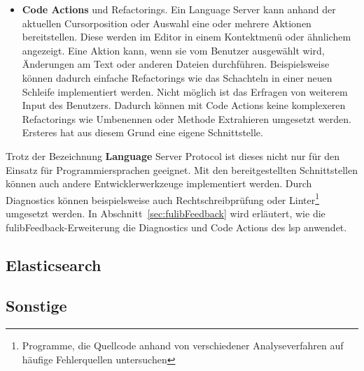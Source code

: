 \begin{itemize}
    \item \textbf{Code Actions} und Refactorings.
    Ein Language Server kann anhand der aktuellen Cursorposition oder Auswahl eine oder mehrere Aktionen bereitstellen.
    Diese werden im Editor in einem Kontektmenü oder ähnlichem angezeigt.
    Eine Aktion kann, wenn sie vom Benutzer ausgewählt wird, Änderungen am Text oder anderen Dateien durchführen.
    Beispielsweise können dadurch einfache Refactorings wie das Schachteln in einer neuen Schleife implementiert werden.
    Nicht möglich ist das Erfragen von weiterem Input des Benutzers.
    Dadurch können mit Code Actions keine komplexeren Refactorings wie Umbenennen oder Methode Extrahieren umgesetzt werden.
    Ersteres hat aus diesem Grund eine eigene Schnittstelle.
\end{itemize}

Trotz der Bezeichnung \textbf{Language} Server Protocol ist dieses nicht nur für den Einsatz für Programmiersprachen geeignet.
Mit den bereitgestellten Schnittstellen können auch andere Entwicklerwerkzeuge implementiert werden.
Durch Diagnostics können beispielsweise auch Rechtschreibprüfung oder Linter\footnote{Programme, die Quellcode anhand von verschiedener Analyseverfahren auf häufige Fehlerquellen untersuchen} umgesetzt werden.
In Abschnitt~\ref{sec:fulibFeedback} wird erläutert, wie die fulibFeedback-Erweiterung die Diagnostics und Code Actions des \ac{lsp} anwendet.

\subsection{Elasticsearch}\label{subsec:elasticsearch}


\subsection{Sonstige}\label{subsec:other-libraries}

